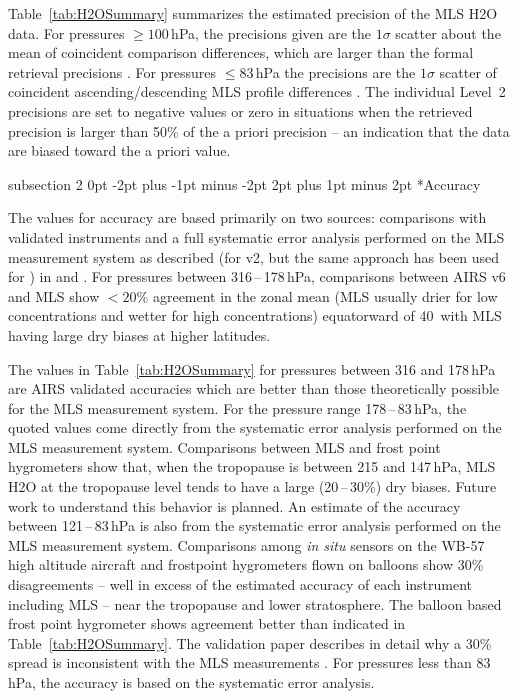 \documentclass[11pt,draft]{report}
\makeatletter
\renewcommand{\subsection}{\@startsection%
  {subsection}%
  {2}%
  {0pt}%
  {-2pt plus -1pt minus -2pt}%
  {2pt plus 1pt minus 2pt}%
  {\large\sffamily\fontseries{sb}\selectfont\flushleft\color{SectionColor}\figureversion{tabular}}}%
\makeatother
\begin{document}
Table~\ref{tab:H2OSummary} summarizes the estimated precision of the MLS
\thisv H\cs2O data. For pressures $\geq100$\,hPa, the precisions
given are the $1\sigma$ scatter about the mean of coincident comparison
differences, which are larger than the formal retrieval precisions
\citep{ReadEtal07}.  For pressures $\leq83$\,hPa the precisions are the
$1\sigma$ scatter of coincident ascending/descending MLS profile
differences \citep{LambertEtal07}.  The individual Level~2 precisions
are set to negative values or zero in situations when the retrieved
precision is larger than 50\% of the a priori precision -- an indication
that the data are biased toward the a priori value.

\subsection*{Accuracy}

The values for accuracy are based primarily on two sources: comparisons
with validated instruments and a full systematic error analysis
performed on the MLS measurement system as described (for v2, but the
same approach has been used for \thisv) in \citet{ReadEtal07} and
\citet{LambertEtal07}. For pressures between 316\,--\,178\,hPa,
comparisons between AIRS v6 and MLS \thisv show $<20$\% agreement in the
zonal mean (MLS usually drier for low concentrations and wetter for high
concentrations) equatorward of 40\degsym\ with MLS having large dry
biases at higher latitudes.

The values in Table~\ref{tab:H2OSummary} for pressures between 316 and
178\,hPa are AIRS validated accuracies which are better than those
theoretically possible for the MLS measurement system. For the pressure
range 178\,--\,83\,hPa, the quoted values come directly from the
systematic error analysis performed on the MLS measurement
system. Comparisons between MLS and frost point hygrometers show that,
when the tropopause is between 215 and 147\,hPa, MLS H\cs2O at the
tropopause level tends to have a large (20\,--\,30\%) dry biases.
Future work to understand this behavior is planned.  An estimate of the
accuracy between 121\,--\,83\,hPa is also from the systematic error
analysis performed on the MLS measurement system.  Comparisons among
\emph{in situ} sensors on the WB-57 high altitude aircraft and
frostpoint hygrometers flown on balloons show 30\% disagreements -- well
in excess of the estimated accuracy of each instrument including MLS --
near the tropopause and lower stratosphere.  The balloon based frost
point hygrometer shows agreement better than indicated in
Table~\ref{tab:H2OSummary}. The validation paper describes in detail why
a 30\% spread is inconsistent with the MLS measurements
\citep{ReadEtal07}.  For pressures less than 83\,hPa, the accuracy is
based on the systematic error analysis.
\end{document}
